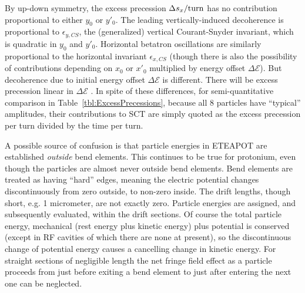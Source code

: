 \documentclass[]{article}
\begin{document}
By up-down symmetry, the excess precession $\Delta s_x/{\rm turn}$ has
no contribution proportional to either $y_0$ or $y'_0$. The leading 
vertically-induced decoherence
is proportional to $\epsilon_{y,CS}$, the (generalized) vertical Courant-Snyder
invariant, which is quadratic in $y_0$ and $y'_0$. Horizontal betatron
oscillations are similarly proportional to the horizontal invariant 
$\epsilon_{x,CS}$ (though there is also the possibility of contributions
depending on $x_0$ or $x'_0$ multiplied by energy offset
$\Delta\mathcal{E}$). But decoherence due to initial energy offset 
$\Delta\mathcal{E}$ is different. There will
be excess precession linear in $\Delta\mathcal{E}$ . In spite
of these differences, for semi-quantitative comparison 
in Table~\ref{tbl:ExcessPrecessions}, because all
8 particles have ``typical'' amplitudes, their contributions to SCT are
simply quoted as the excess precession per turn divided by the
time per turn.  

A possible source of confusion is that particle energies in
ETEAPOT are established \emph{outside} bend elements. This continues
to be true for protonium, even though the particles are almost
never outside bend elements. Bend elements are treated as having
``hard'' edges, meaning the electric potential changes discontinuously 
from zero outside, to non-zero inside. The drift lengths, though short, 
e.g. 1 micrometer, are not exactly zero. Particle energies are
assigned, and subsequently evaluated, within the drift sections.
Of course the total particle energy, mechanical (rest energy plus
kinetic energy) plus potential is conserved (except in RF cavities
of which there are none at present), so the discontinuous 
change of potential energy causes a cancelling change in kinetic 
energy. For straight sections of negligible length
the net fringe field effect as a particle proceeds from just 
before exiting a bend element to just after entering the next one
can be neglected.
\end{document}
